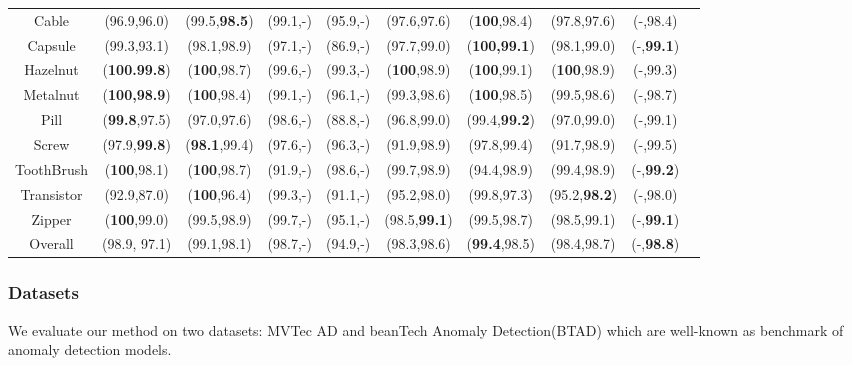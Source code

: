 \documentclass[letterpaper]{article}
\begin{document}
\begin{table*}[t]
\begin{tabular}{c|c|c|c|c|c|c|c|cc}
Cable      & (96.9,96.0) & (99.5,\textbf{98.5}) & (99.1,-) & (95.9,-)  & (97.6,97.6) & (\textbf{100},98.4)        & \multicolumn{1}{c|}{(97.8,97.6)} & \multicolumn{1}{c}{(-,98.4)} \\
Capsule    & (99.3,93.1) & (98.1,98.9) & (97.1,-) & (86.9,-)  & (97.7,99.0) & (\textbf{100,99.1})       & \multicolumn{1}{c|}{(98.1,99.0)} & \multicolumn{1}{c}{(-,\textbf{99.1})} \\
Hazelnut   & (\textbf{100.99.8})  & (\textbf{100},98.7)  & (99.6,-) & (99.3,-)  & (\textbf{100},98.9)  & (\textbf{100},99.1)         & \multicolumn{1}{c|}{(\textbf{100},98.9)}  & \multicolumn{1}{c}{(-,99.3)} \\
Metalnut  & (\textbf{100,98.9})  & (\textbf{100},98.4)  & (99.1,-) & (96.1,-)  & (99.3,98.6) & (\textbf{100},98.5)       & \multicolumn{1}{c|}{(99.5,98.6)} & \multicolumn{1}{c}{(-,98.7)} \\
Pill       & (\textbf{99.8},97.5) & (97.0,97.6) & (98.6,-) & (88.8,-)  & (96.8,99.0) & (99.4,\textbf{99.2})         & \multicolumn{1}{c|}{(97.0,99.0)} & \multicolumn{1}{c}{(-,99.1)} \\
Screw      & (97.9,\textbf{99.8}) & (\textbf{98.1},99.4) & (97.6,-) & (96.3,-)  & (91.9,98.9) & (97.8,99.4)   & \multicolumn{1}{c|}{(91.7,98.9)} & \multicolumn{1}{c}{(-,99.5)}        \\
ToothBrush & (\textbf{100},98.1)  & (\textbf{100},98.7)  & (91.9,-) & (98.6,-)  & (99.7,98.9) & (94.4,98.9)     & \multicolumn{1}{c|}{(99.4,98.9)} & \multicolumn{1}{c}{(-,\textbf{99.2})} \\
Transistor & (92.9,87.0) & (\textbf{100},96.4)  & (99.3,-) & (91.1,-)  & (95.2,98.0) & (99.8,97.3)   & \multicolumn{1}{c|}{(95.2,\textbf{98.2})} & \multicolumn{1}{c}{(-,98.0)} \\
Zipper     & (\textbf{100},99.0)  & (99.5,98.9) & (99.7,-) & (95.1,-)  & (98.5,\textbf{99.1}) & (99.5,98.7)      & \multicolumn{1}{c|}{(98.5,99.1)} & \multicolumn{1}{c}{(-,\textbf{99.1})} \\ \hline
Overall      & (98.9, 97.1) & (99.1,98.1) & (98.7,-) & (94.9,-)  & (98.3,98.6) & (\textbf{99.4},98.5)      & \multicolumn{1}{c|}{(98.4,98.7)} &  \multicolumn{1}{c}{(-,\textbf{98.8})} \\ \hline
\end{tabular}
\end{table*}

\subsubsection{Datasets}
We evaluate our method on two datasets: MVTec AD \cite{bergmann1} and beanTech Anomaly Detection(BTAD) \cite{btad} which are well-known as benchmark of anomaly detection models.
\end{document}
